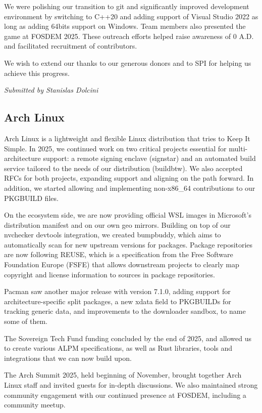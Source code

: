 \documentclass[a4paper]{report}
\begin{document}
We were polishing our transition to git and significantly improved development environment by switching to C++20 and adding support of Visual Studio 2022 as long as adding 64bits support on Windows. Team members also presented the game at FOSDEM 2025. These outreach efforts helped raise awareness of 0 A.D. and facilitated recruitment of contributors.

We wish to extend our thanks to our generous donors and to SPI for helping us achieve this progress.

{\em Submitted by Stanislas Dolcini}

\subsection{Arch Linux}

Arch Linux is a lightweight and flexible Linux distribution that tries to Keep It Simple. In 2025, we continued work on two critical projects essential for multi-architecture support: a remote signing enclave (signstar) and an automated build service tailored to the needs of our distribution (buildbtw). We also accepted RFCs for both projects, expanding support and aligning on the path forward. In addition, we started allowing and implementing non-x86\_64 contributions to our PKGBUILD files.

On the ecosystem side, we are now providing official WSL images in Microsoft's distribution manifest and on our own geo mirrors. Building on top of our nvchecker devtools integration, we created bumpbuddy, which aims to automatically scan for new upstream versions for packages. Package repositories are now following REUSE, which is a specification from the Free Software Foundation Europe (FSFE) that allows downstream projects to clearly map copyright and license information to sources in package repositories.

Pacman saw another major release with version 7.1.0, adding support for architecture-specific split packages, a new xdata field to PKGBUILDs for tracking generic data, and improvements to the downloader sandbox, to name some of them.

The Sovereign Tech Fund funding concluded by the end of 2025, and allowed us to create various ALPM specifications, as well as Rust libraries, tools and integrations that we can now build upon.

The Arch Summit 2025, held beginning of November, brought together Arch Linux staff and invited guests for in-depth discussions. We also maintained strong community engagement with our continued presence at FOSDEM, including a community meetup.
\end{document}
